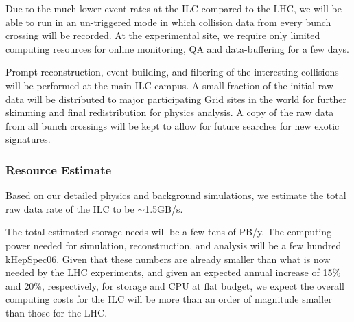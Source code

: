 Due to the much lower event rates at the ILC compared to the LHC, we will be
able to run in an un-triggered mode in which  collision data from every bunch crossing will be recorded. At the experimental site,
we require only limited computing resources for online monitoring, QA and data-buffering for a few days.

Prompt reconstruction, event building, and filtering of the interesting collisions will be performed at the main ILC campus.
A small fraction of the initial raw data will be distributed to major participating Grid sites in the world for further skimming and
final redistribution for physics analysis.
A copy of the raw data from all bunch crossings will be kept to allow  for future searches for new exotic signatures.


\subsubsection{Resource Estimate}

Based on our detailed physics and background simulations,  we estimate the total raw data rate of the ILC to be $\sim$1.5GB/s.

The total estimated storage needs will be a few tens of PB/y.
The computing power needed for simulation, reconstruction, and analysis will be a few hundred kHepSpec06.
Given that these numbers are already smaller than what is now
needed by the LHC experiments, and given an expected annual increase
of 15\% and 20\%, respectively, for storage and CPU
at flat budget, we expect the overall computing costs for the ILC
will be more than an order of magnitude smaller than those for the LHC.




